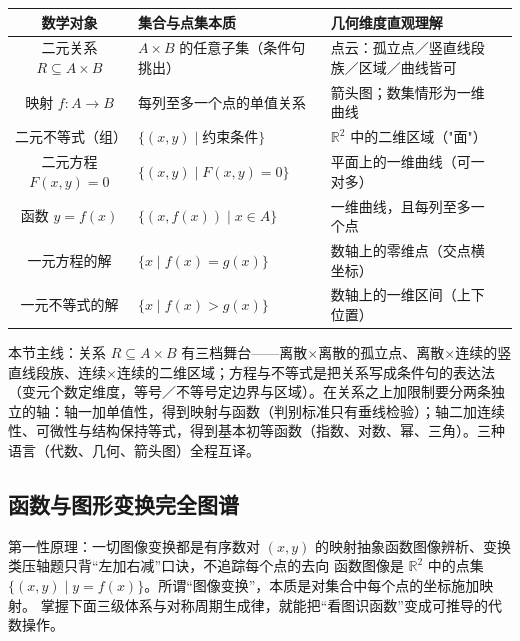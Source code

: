 \begin{explore}
\begin{center}
\begin{tabular}{|c|p{3.0cm}|p{5.2cm}|p{4.2cm}|}
\hline
\textbf{数学对象} & \textbf{集合与点集本质} & \textbf{几何维度直观理解} \\
\hline
二元关系 $R\subseteq A\times B$ & $A\times B$ 的任意子集（条件句挑出） & 点云：孤立点／竖直线段族／区域／曲线皆可 \\
\hline
映射 $f:A\to B$ & 每列至多一个点的单值关系 & 箭头图；数集情形为一维曲线 \\
\hline
二元不等式（组） & $\{(x,y)\mid \text{约束条件}\}$ & $\mathbb{R}^2$ 中的二维区域（"面"） \\
\hline
二元方程 $F(x,y)=0$ & $\{(x,y)\mid F(x,y)=0\}$ & 平面上的一维曲线（可一对多） \\
\hline
函数 $y=f(x)$ & $\{(x,f(x))\mid x\in A\}$ & 一维曲线，且每列至多一个点 \\
\hline
一元方程的解 & $\{x\mid f(x)=g(x)\}$ & 数轴上的零维点（交点横坐标） \\
\hline
一元不等式的解 & $\{x\mid f(x)>g(x)\}$ & 数轴上的一维区间（上下位置） \\
\hline
\end{tabular}
\end{center}

\begin{summary}
本节主线：关系 $R\subseteq A\times B$ 有三档舞台——离散$\times$离散的孤立点、离散$\times$连续的竖直线段族、连续$\times$连续的二维区域；方程与不等式是把关系写成条件句的表达法（变元个数定维度，等号／不等号定边界与区域）。在关系之上加限制要分两条独立的轴：轴一加单值性，得到映射与函数（判别标准只有垂线检验）；轴二加连续性、可微性与结构保持等式，得到基本初等函数（指数、对数、幂、三角）。三种语言（代数、几何、箭头图）全程互译。
\end{summary}

\subsection{函数与图形变换完全图谱}

\begin{conccard}[一级]{第一性原理：一切图像变换都是有序数对 $(x,y)$ 的映射}{抽象函数图像辨析、变换类压轴题}{只背“左加右减”口诀，不追踪每个点的去向}
函数图像是 $\mathbb{R}^2$ 中的点集 $\{(x,y)\mid y=f(x)\}$。所谓“图像变换”，本质是对集合中每个点的坐标施加映射。
掌握下面三级体系与对称周期生成律，就能把“看图识函数”变成可推导的代数操作。
\end{conccard}


\end{explore}
